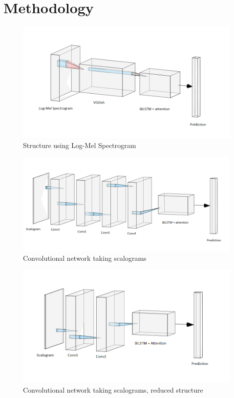 \documentclass[final]{cvpr}
\begin{document}
\section{Methodology}
\begin{figure}
	\centering
	\includegraphics[scale = 0.45]{bilstm.png}
	\caption{Structure using Log-Mel Spectrogram}
	\label{mel}
\end{figure}
\begin{figure}
	\centering
	\includegraphics[scale = 0.65]{cnn.png}
	\caption{Convolutional network taking scalograms}
	\label{cnn}
\end{figure}
\begin{figure}
	\centering
	\includegraphics[scale = 0.45]{cnnreduit.png}
	\caption{Convolutional network taking scalograms, reduced structure}
	\label{reduit}
\end{figure}
\end{document}

